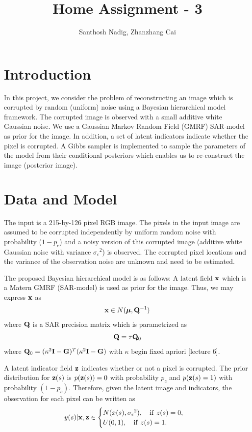 \documentclass[a4paper,10pt]{article}
\title{Home Assignment - 3}
\author{Santhosh Nadig, Zhanzhang Cai}
\def\bI{{\bf I}}
\def\bG{{\bf G}}
\def\bQ{{\bf Q}}
\def\bx{{\bf x}}
\def\bz{{\bf z}}
\def\bmu{{\boldsymbol \mu}}
\def\sigmaeps{{\sigma_{\epsilon}}}
\begin{document}
\maketitle

\section{Introduction}
In this project, we consider the problem of reconstructing an image which is corrupted by random (uniform) noise using a Bayesian hierarchical model framework. The corrupted image is observed with a small additive white Gaussian noise. We use a Gaussian Markov Random Field (GMRF) SAR-model as prior for the image. In addition, a set of latent indicators indicate whether the pixel is corrupted. A Gibbs sampler is implemented to sample the parameters of the model from their conditional posteriors which enables us to re-construct the image (posterior image).

\section{Data and Model}
The input is a 215-by-126 pixel RGB image. The pixels in the input image are assumed to be corrupted independently by uniform random noise with probability ($1-p_c$) and a noisy version of this corrupted image (additive white Gaussian noise with variance $\sigmaeps^2$) is observed. The corrupted pixel locations and the variance of the observation noise are unknown and need to be estimated.

The proposed Bayesian hierarchical model is as follows: A latent field $\bx$ which is a Matern GMRF (SAR-model) is used as prior for the image. Thus, we may express $\bx$ as
\begin{equation}
 \bx \in N(\bmu, \bQ^{-1})
 \label{eq:latentfield}
\end{equation}
where $\bQ$ is a SAR precision matrix which is parametrized as 
\begin{equation*}
 \bQ = \tau \bQ_0
\end{equation*}
where $\bQ_0 = (\kappa^2 \bI - \bG)^T (\kappa^2 \bI - \bG)$ with $\kappa$ begin fixed apriori [lecture 6].

A latent indicator field $\bz$ indicates whether or not a pixel is corrupted. The prior distribution for $\bz(s)$ is $p(\bz(s)) = 0$ with probability $p_c$ and $p(\bz(s) = 1)$ with probability $(1-p_c)$. Therefore, given the latent image and indicators, the observation for each pixel can be written as
\begin{equation}
 y(s)|\bx,\bz \in \begin{cases}
                   N(x(s), \sigmaeps^2),\quad \mathrm{if }~ z(s) = 0,\\
                   U(0,1), \quad \mathrm{if }~ z(s) = 1.
                  \end{cases}
\end{equation}
\end{document}
